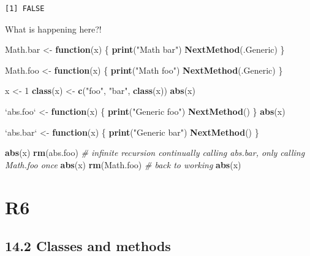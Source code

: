 \documentclass[]{book}
\newenvironment{Shaded}{\begin{snugshade}}{\end{snugshade}}
\newcommand{\CommentTok}[1]{\textcolor[rgb]{0.56,0.35,0.01}{\textit{#1}}}
\newcommand{\ControlFlowTok}[1]{\textcolor[rgb]{0.13,0.29,0.53}{\textbf{#1}}}
\newcommand{\DataTypeTok}[1]{\textcolor[rgb]{0.13,0.29,0.53}{#1}}
\newcommand{\DecValTok}[1]{\textcolor[rgb]{0.00,0.00,0.81}{#1}}
\newcommand{\KeywordTok}[1]{\textcolor[rgb]{0.13,0.29,0.53}{\textbf{#1}}}
\newcommand{\NormalTok}[1]{#1}
\newcommand{\StringTok}[1]{\textcolor[rgb]{0.31,0.60,0.02}{#1}}
\begin{document}
\begin{verbatim}
[1] FALSE
\end{verbatim}

What is happening here?!

\begin{Shaded}
\begin{Highlighting}[]
\NormalTok{Math.bar <-}\StringTok{ }\ControlFlowTok{function}\NormalTok{(x) \{}
  \KeywordTok{print}\NormalTok{(}\StringTok{"Math bar"}\NormalTok{)}
  \KeywordTok{NextMethod}\NormalTok{(.Generic)}
\NormalTok{\}}

\NormalTok{Math.foo <-}\StringTok{ }\ControlFlowTok{function}\NormalTok{(x) \{}
  \KeywordTok{print}\NormalTok{(}\StringTok{"Math foo"}\NormalTok{)}
  \KeywordTok{NextMethod}\NormalTok{(.Generic)}
\NormalTok{\}}

\NormalTok{x <-}\StringTok{ }\DecValTok{1}
\KeywordTok{class}\NormalTok{(x) <-}\StringTok{ }\KeywordTok{c}\NormalTok{(}\StringTok{"foo"}\NormalTok{, }\StringTok{"bar"}\NormalTok{, }\KeywordTok{class}\NormalTok{(x))}
\KeywordTok{abs}\NormalTok{(x)}

\StringTok{`}\DataTypeTok{abs.foo}\StringTok{`}\NormalTok{ <-}\StringTok{ }\ControlFlowTok{function}\NormalTok{(x) \{}
  \KeywordTok{print}\NormalTok{(}\StringTok{"Generic foo"}\NormalTok{)}
  \KeywordTok{NextMethod}\NormalTok{()}
\NormalTok{\}}
\KeywordTok{abs}\NormalTok{(x)}

\StringTok{`}\DataTypeTok{abs.bar}\StringTok{`}\NormalTok{ <-}\StringTok{ }\ControlFlowTok{function}\NormalTok{(x) \{}
  \KeywordTok{print}\NormalTok{(}\StringTok{"Generic bar"}\NormalTok{)}
  \KeywordTok{NextMethod}\NormalTok{()}
\NormalTok{\}}

\KeywordTok{abs}\NormalTok{(x)}
\KeywordTok{rm}\NormalTok{(abs.foo)}
\CommentTok{# infinite recursion continually calling abs.bar, only calling Math.foo once}
\KeywordTok{abs}\NormalTok{(x)}
\KeywordTok{rm}\NormalTok{(Math.foo)}
\CommentTok{# back to working}
\KeywordTok{abs}\NormalTok{(x)}
\end{Highlighting}
\end{Shaded}

\hypertarget{r6}{%
\chapter{R6}\label{r6}}

\hypertarget{classes-and-methods}{%
\section*{14.2 Classes and methods}\label{classes-and-methods}}
\end{document}
